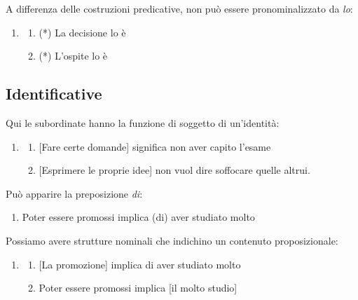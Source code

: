 \documentclass[
  a4paper,
  twoside,
  11pt,
  chapterprefix=false,
  bibliography=totocnumbered,
  listof=flat]{scrbook}
\providecommand{\tightlist}{%
  \setlength{\itemsep}{0pt}\setlength{\parskip}{0pt}}
\begin{document}
A differenza delle costruzioni predicative, non può essere pronominalizzato da \emph{lo}:

\begin{enumerate}
\def\labelenumi{(\arabic{enumi})}
\setcounter{enumi}{35}
\item
  \begin{enumerate}
  \def\labelenumii{\alph{enumii}.}
  \tightlist
  \item
    (*) La decisione lo è
  \item
    (*) L'ospite lo è
  \end{enumerate}
\end{enumerate}

\hypertarget{identificative}{%
\subsection{Identificative}\label{identificative}}

Qui le subordinate hanno la funzione di soggetto di un'identità:

\begin{enumerate}
\def\labelenumi{(\arabic{enumi})}
\setcounter{enumi}{36}
\item
  \begin{enumerate}
  \def\labelenumii{\alph{enumii}.}
  \tightlist
  \item
    {[}Fare certe domande{]} significa non aver capito l'esame
  \item
    {[}Esprimere le proprie idee{]} non vuol dire soffocare quelle altrui.
  \end{enumerate}
\end{enumerate}

Può apparire la preposizione \emph{di}:

\begin{enumerate}
\def\labelenumi{(\arabic{enumi})}
\setcounter{enumi}{37}
\tightlist
\item
  Poter essere promossi implica (di) aver studiato molto
\end{enumerate}

Possiamo avere strutture nominali che indichino un contenuto proposizionale:

\begin{enumerate}
\def\labelenumi{(\arabic{enumi})}
\setcounter{enumi}{38}
\item
  \begin{enumerate}
  \def\labelenumii{\alph{enumii}.}
  \tightlist
  \item
    {[}La promozione{]} implica di aver studiato molto
  \item
    Poter essere promossi implica {[}il molto studio{]}
  \end{enumerate}
\end{enumerate}
\end{document}
